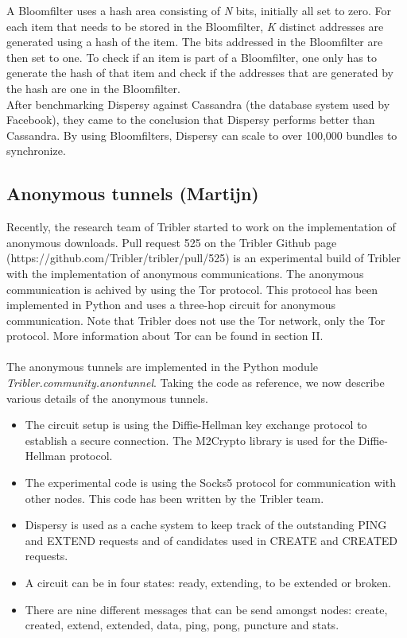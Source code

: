 \documentclass[11pt]{article}
\begin{document}
A Bloomfilter uses a hash area consisting of \emph{N} bits, initially all set to zero. For each item that needs to be stored in the Bloomfilter, \emph{K} distinct addresses are generated using a hash of the item. The bits addressed in the Bloomfilter are then set to one. To check if an item is part of a Bloomfilter, one only has to generate the hash of that item and check if the addresses that are generated by the hash are one in the Bloomfilter.\\

After benchmarking Dispersy against Cassandra (the database system used by Facebook), they came to the conclusion that Dispersy performs better than Cassandra. By using Bloomfilters, Dispersy can scale to over 100,000 bundles to synchronize.


\subsection{Anonymous tunnels (Martijn)}
Recently, the research team of Tribler started to work on the implementation of anonymous downloads. Pull request 525 on the Tribler Github page (https://github.com/Tribler/tribler/pull/525) is an experimental build of Tribler with the implementation of anonymous communications. The anonymous communication is achived by using the Tor protocol. This protocol has been implemented in Python and uses a three-hop circuit for anonymous communication. Note that Tribler does not use the Tor network, only the Tor protocol. More information about Tor can be found in section II.\\\\
The anonymous tunnels are implemented in the Python module \emph{Tribler.community.anontunnel}. Taking the code as reference, we now describe various details of the anonymous tunnels.
\begin{itemize} 
\item The circuit setup is using the Diffie-Hellman key exchange protocol to establish a secure connection. The M2Crypto library is used for the Diffie-Hellman protocol.
\item The experimental code is using the Socks5 protocol for communication with other nodes. This code has been written by the Tribler team.
\item Dispersy is used as a cache system to keep track of the outstanding PING and EXTEND requests and of candidates used in CREATE and CREATED requests.
\item A circuit can be in four states: ready, extending, to be extended or broken.
\item There are nine different messages that can be send amongst nodes: create, created, extend, extended, data, ping, pong, puncture and stats.
\end{itemize}
\end{document}
